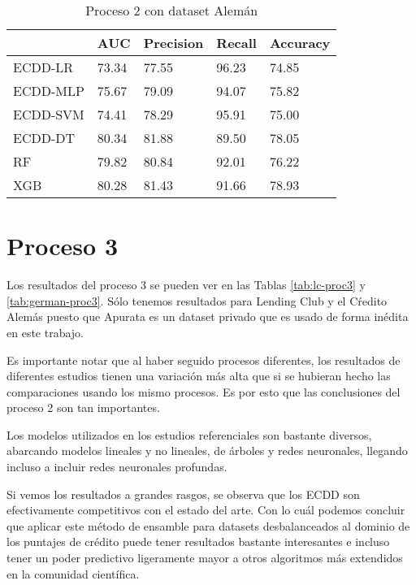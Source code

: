 \begin{table}[]
\centering
\caption{Proceso 2 con dataset Alemán}
\label{tab:german-proc2}
\begin{tabularx}{0.75\textwidth}{|l|Y Y Y Y|}
                \hline
                & AUC       & Precision & Recall    & Accuracy  \\
                \hline
ECDD-LR           & 73.34     & 77.55     & 96.23     & 74.85     \\
ECDD-MLP          & 75.67     & 79.09     & 94.07     & 75.82     \\
ECDD-SVM          & 74.41     & 78.29     & 95.91     & 75.00     \\
ECDD-DT           & 80.34     & 81.88     & 89.50     & 78.05     \\
                \hline
RF              & 79.82     & 80.84     & 92.01     & 76.22     \\
XGB             & 80.28     & 81.43     & 91.66     & 78.93     \\
                \hline
\end{tabularx}
\end{table}


\section{Proceso 3} %

Los resultados del proceso 3 se pueden ver en las Tablas \ref{tab:lc-proc3} y \ref{tab:german-proc3}. Sólo tenemos resultados para Lending Club y el Cŕedito Alemás puesto que Apurata es un dataset privado que es usado de forma inédita en este trabajo.

Es importante notar que al haber seguido procesos diferentes, los resultados de diferentes estudios tienen una variación más alta que si se hubieran hecho las comparaciones usando los mismo procesos. Es por esto que las conclusiones del proceso 2 son tan importantes.

Los modelos utilizados en los estudios referenciales son bastante diversos, abarcando modelos lineales y no lineales, de árboles y redes neuronales, llegando incluso a incluir redes neuronales profundas.

Si vemos los resultados a grandes rasgos, se observa que los \ac{ECDD} son efectivamente competitivos con el estado del arte. Con lo cuál podemos concluir que aplicar este método de ensamble para datasets desbalanceados al dominio de los puntajes de crédito puede tener resultados bastante interesantes e incluso tener un poder predictivo ligeramente mayor a otros algoritmos más extendidos en la comunidad científica. 


